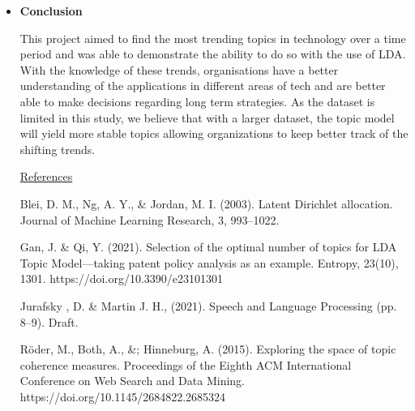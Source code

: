 \documentclass{article}
\begin{document}
\begin{titlepage}
\begin{itemize}
           \item[] \textbf{Conclusion}
          
          \quad This project aimed to find the most trending topics in technology over a time period and was able to demonstrate the ability to do so with the use of LDA. With the knowledge of these trends, organisations have a better understanding of the applications in different areas of tech and are better able to make decisions regarding long term strategies. As the dataset is limited in this study,  we believe that with a larger dataset, the topic model will yield more stable topics allowing organizations to keep better track of the shifting trends.
  \pagebreak  
  
        
\underline{References}

\quad Blei, D. M., Ng, A. Y., \& Jordan, M. I. (2003). Latent
Dirichlet allocation. Journal of Machine Learning Research, 3, 993–1022.

\quad Gan, J. \&  Qi, Y. (2021). Selection of the optimal number of topics for LDA Topic Model—taking patent policy analysis as an example. Entropy, 23(10), 1301. https://doi.org/10.3390/e23101301 

\quad Jurafsky , D. \& Martin J. H.,  (2021). Speech and Language Processing (pp. 8–9). Draft. 

\quad Röder, M., Both, A., \&; Hinneburg, A. (2015). Exploring the space of topic coherence measures. Proceedings of the Eighth ACM International Conference on Web Search and Data Mining. https://doi.org/10.1145/2684822.2685324 

        \end{itemize}
	
	\pagebreak

\end{titlepage}
\end{document}
